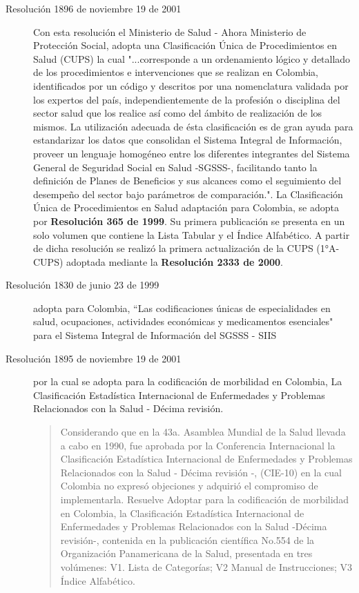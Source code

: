 \begin{description}
\item[Resolución 1896 de noviembre 19 de 2001] Con esta resolución el Ministerio de Salud - Ahora Ministerio de Protección Social, adopta una Clasificación Única de Procedimientos en Salud (CUPS) la cual "...corresponde a un ordenamiento lógico y detallado de los procedimientos e intervenciones que se realizan en Colombia, identificados por un código y descritos por una nomenclatura validada por los expertos del país, independientemente de la profesión o disciplina del sector salud que los realice así como del ámbito de realización de los mismos. La utilización adecuada de ésta clasificación es de gran ayuda para estandarizar los datos que consolidan el Sistema Integral de Información, proveer un lenguaje homogéneo entre los diferentes integrantes del Sistema General de Seguridad Social en Salud -SGSSS-, facilitando tanto la definición de Planes de Beneficios y sus alcances como el seguimiento del desempeño del sector bajo parámetros de comparación."\cite{minsalud1896}. La Clasificación Única de Procedimientos en Salud adaptación para Colombia, se adopta por \textbf{Resolución 365 de 1999}. Su primera publicación se presenta en un solo volumen que contiene la Lista Tabular y el Índice Alfabético. A partir de dicha resolución se realizó la primera actualización de la CUPS (1°A-CUPS) adoptada mediante la \textbf{Resolución 2333 de 2000}.

\item[Resolución 1830 de junio 23 de 1999] adopta para Colombia, “Las codificaciones únicas de especialidades en salud, ocupaciones, actividades económicas y medicamentos esenciales" para el Sistema Integral de Información del SGSSS - SIIS 

\item[Resolución 1895 de noviembre 19 de 2001] por la cual se adopta para la codificación de morbilidad en Colombia, La Clasificación Estadística Internacional de Enfermedades y Problemas Relacionados con la Salud - Décima revisión. 

\begin{quote}
Considerando que en la 43a. Asamblea Mundial de la Salud llevada a cabo en 1990, fue aprobada por la Conferencia Internacional la Clasificación Estadística Internacional de Enfermedades y Problemas Relacionados con la Salud - Décima revisión -, (CIE-10) en la cual Colombia no expresó objeciones y adquirió el compromiso de implementarla. Resuelve Adoptar para la codificación de morbilidad en Colombia, la Clasificación Estadística Internacional de Enfermedades y Problemas Relacionados con la Salud -Décima revisión-, contenida en la publicación científica No.554 de la Organización Panamericana de la Salud, presentada en tres volúmenes: V1. Lista de Categorías; V2 Manual de Instrucciones; V3 Índice Alfabético.\end{quote} 


\end{description}
